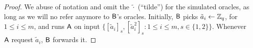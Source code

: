 \begin{proof}
We abuse of notation and omit the $\tilde{\cdot}$ (``tilde'') for the simulated oracles, as long as we will no refer anymore to $\mathsf{B}$'s oracles. Initially, $\mathsf{B}$ picks $\tilde{a}_{i}\gets\mathbb{Z}_q$, for $1\leq i \leq m$, and runs $\mathsf{A}$ on input $\{[\tilde{a}_{i}]_s,[\tilde{a}^2_{i}]_s:1\leq i\leq m, s\in\{1,2\}\}$.
Whenever $\mathsf{A}$ request $\tilde{a}_i$, $\mathsf{B}$ forwards it.
%
%
%

\end{proof}
